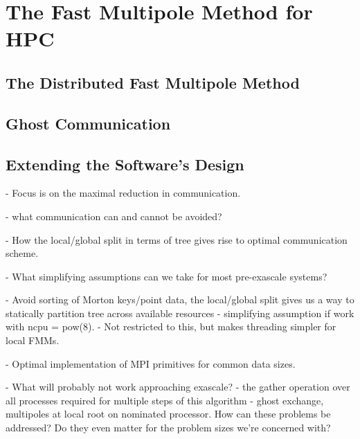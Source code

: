 \chapter{The Fast Multipole Method for HPC}\label{chpt:hpc}
\thispagestyle{chaptertitle} %

\section{The Distributed Fast Multipole Method}


\section{Ghost Communication}


\section{Extending the Software's Design}



- Focus is on the maximal reduction in communication.

- what communication can and cannot be avoided?

- How the local/global split in terms of tree gives rise to optimal communication scheme.

- What simplifying assumptions can we take for most pre-exascale systems?

- Avoid sorting of Morton keys/point data, the local/global split gives us a way to statically partition tree across available resources - simplifying assumption if work with ncpu = pow(8).
- Not restricted to this, but makes threading simpler for local FMMs.

- Optimal implementation of MPI primitives for common data sizes.

- What will probably not work approaching exascale?
- the gather operation over all processes required for multiple steps of this algorithm - ghost exchange, multipoles at local root on nominated processor. How can these problems be addressed? Do they even matter for the problem sizes we're concerned with?

